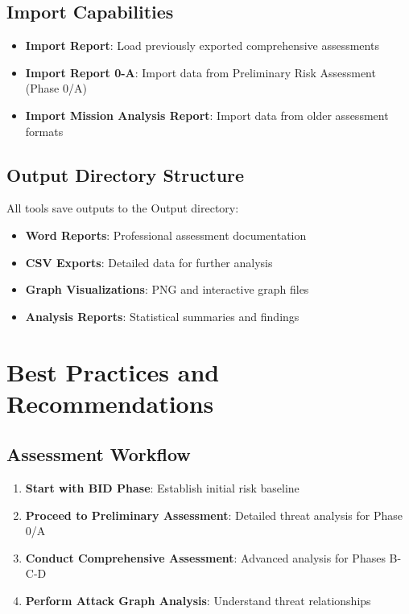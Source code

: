 \documentclass[binding=0.6cm]{sapthesis}
\begin{document}
\subsection{Import Capabilities}

\begin{itemize}
    \item \textbf{Import Report}: Load previously exported comprehensive assessments
    \item \textbf{Import Report 0-A}: Import data from Preliminary Risk Assessment (Phase 0/A)
    \item \textbf{Import Mission Analysis Report}: Import data from older assessment formats
\end{itemize}

\subsection{Output Directory Structure}

All tools save outputs to the Output directory:
\begin{itemize}
    \item \textbf{Word Reports}: Professional assessment documentation
    \item \textbf{CSV Exports}: Detailed data for further analysis
    \item \textbf{Graph Visualizations}: PNG and interactive graph files
    \item \textbf{Analysis Reports}: Statistical summaries and findings
\end{itemize}

\section{Best Practices and Recommendations}

\subsection{Assessment Workflow}

\begin{enumerate}
    \item \textbf{Start with BID Phase}: Establish initial risk baseline
    \item \textbf{Proceed to Preliminary Assessment}: Detailed threat analysis for Phase 0/A
    \item \textbf{Conduct Comprehensive Assessment}: Advanced analysis for Phases B-C-D
    \item \textbf{Perform Attack Graph Analysis}: Understand threat relationships
\end{enumerate}
\end{document}

